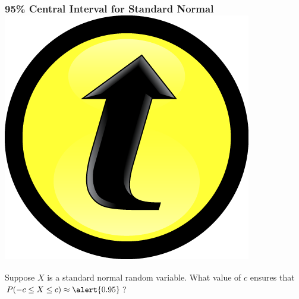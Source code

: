 \documentclass[handout]{beamer}
\begin{document}
\begin{frame}
\frametitle{95\% Central Interval for Standard Normal \hfill \includegraphics[scale = 0.05]{./images/clicker}}

Suppose $X$ is a standard normal random variable. What value of $c$ ensures that $P(-c \leq X \leq c) \approx \alert{0.95}$?

\end{frame}


\end{document}
